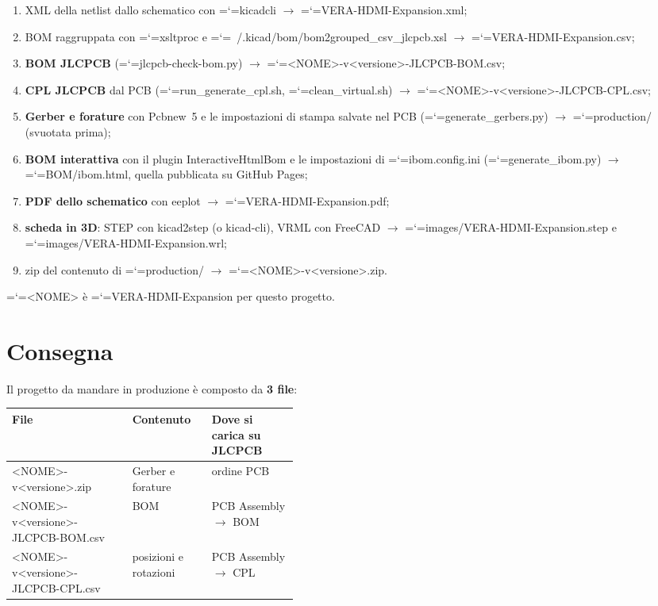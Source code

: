 \documentclass[11pt,a4paper]{article}
\makeatletter
\newcommand{\projname}{VERA-HDMI-Expansion}
\newcommand{\file}[1]{{\ttfamily\hyphenchar\font=`\-\relax\language=\l@nohyphenation #1}}
\makeatother
\begin{document}
\begin{enumerate}[leftmargin=*]
  \item XML della netlist dallo schematico con \file{kicadcli}
        $\rightarrow$ \file{VERA-HDMI-Expansion.xml};
  \item BOM raggruppata con \file{xsltproc} e
        \file{~/.kicad/bom/bom2grouped\_csv\_jlcpcb.xsl}
        $\rightarrow$ \file{VERA-HDMI-Expansion.csv};
  \item \textbf{BOM JLCPCB} (\file{jlcpcb-check-bom.py})
        $\rightarrow$ \file{<NOME>-v<versione>-JLCPCB-BOM.csv};
  \item \textbf{CPL JLCPCB} dal PCB (\file{run\_generate\_cpl.sh},
        \file{clean\_virtual.sh}) $\rightarrow$
        \file{<NOME>-v<versione>-JLCPCB-CPL.csv};
  \item \textbf{Gerber e forature} con Pcbnew~5 e le impostazioni di stampa
        salvate nel PCB (\file{generate\_gerbers.py}) $\rightarrow$
        \file{production/} (svuotata prima);
  \item \textbf{BOM interattiva} con il plugin InteractiveHtmlBom e le
        impostazioni di \file{ibom.config.ini} (\file{generate\_ibom.py})
        $\rightarrow$ \file{BOM/ibom.html}, quella pubblicata su GitHub Pages;
  \item \textbf{PDF dello schematico} con eeplot $\rightarrow$
        \file{VERA-HDMI-Expansion.pdf};
  \item \textbf{scheda in 3D}: STEP con kicad2step (o kicad-cli), VRML con
        FreeCAD $\rightarrow$ \file{images/VERA-HDMI-Expansion.step} e
        \file{images/VERA-HDMI-Expansion.wrl};
  \item zip del contenuto di \file{production/} $\rightarrow$
        \file{<NOME>-v<versione>.zip}.
\end{enumerate}

\file{<NOME>} è \file{\projname} per questo progetto.

\section{Consegna}

Il progetto da mandare in produzione è composto da \textbf{3 file}:

\begin{center}
\begin{tabularx}{\linewidth}{>{\raggedright\arraybackslash\ttfamily\small}p{0.42\linewidth} L L}
\toprule
\normalfont\normalsize\textbf{File} & \textbf{Contenuto} & \textbf{Dove si carica su JLCPCB} \\
\midrule
<NOME>-v<versione>.zip             & Gerber e forature     & ordine PCB \\
<NOME>-v<versione>-JLCPCB-BOM.csv  & BOM                   & PCB Assembly $\rightarrow$ BOM \\
<NOME>-v<versione>-JLCPCB-CPL.csv  & posizioni e rotazioni & PCB Assembly $\rightarrow$ CPL \\
\bottomrule
\end{tabularx}
\end{center}
\end{document}
